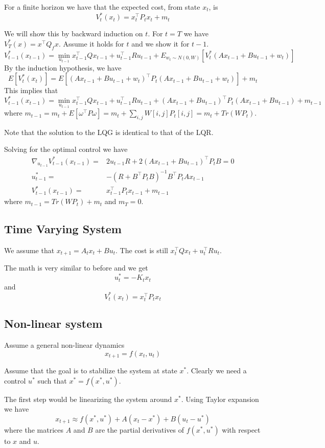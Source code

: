 For a finite horizon we have that the expected cost, from state $x_t$, is
\[
V^*_t(x_t)= x_t^\top P_t x_t + m_t
\]

 We will show this by
backward induction on $t$. For $t=T$ we have $V_T^*(x)=x^\top Q_fx$.
Assume it holds for $t$ and we show it for $t-1$.
\[
V^*_{t-1}(x_{t-1})=\min_{u_{t-1}} x_{t-1}^\top Qx_{t-1}+u_{t-1}^\top
Ru_{t-1}+E_{w_t\sim N(0,W)}[V^*_t(Ax_{t-1}+Bu_{t-1}+w_t)]
\]
By the induction hypothesis, we have
\[
E[V^*_t(x_t)]=E[(Ax_{t-1}+Bu_{t-1}+w_t)^\top P_t
(Ax_{t-1}+Bu_{t-1}+w_t)]+m_t
\]
This implies that
\[
V^*_{t-1}(x_{t-1})=\min_{u_{t-1}} x_{t-1}^\top Qx_{t-1}+u_{t-1}^\top
Ru_{t-1}+(Ax_{t-1}+Bu_{t-1})^\top P_t (Ax_{t-1}+Bu_{t-1})+m_{t-1}
\]
where $m_{t-1}=m_t +E[\omega^\top P \omega]=m_t +\sum_{i,j} W[i,j]P_t[i,j]=m_t +Tr(WP_t)$.

Note that the solution to the LQG is identical to that of the LQR.

Solving for the optimal control we have
\begin{align*}
\nabla_{u_{t-1}} V^*_{t-1}(x_{t-1}) =&
2u_{t-1}R+2(Ax_{t-1}+Bu_{t-1})^\top P_t B =0\\
u_{t-1}^*=& -(R+B^\top P_t B)^{-1}B^\top P_t Ax_{t-1}\\
V^*_{t-1}(x_{t-1})=&x_{t-1}^\top P_t x_{t-1} + m_{t-1}
\end{align*}
where $m_{t-1}=Tr(WP_t)+m_t$ and $m_T=0$.

\subsection{Time Varying System}

We assume that $x_{t+1}=A_t x_t +B u_t$. The cost is still $x_t^\top
Qx_t+u_t^\top Ru_t$.

The math is very similar to before and we get
\[
u_t^*=-K_t x_t
\]
and
\[
V^*_t(x_t)=x_t^\top P_t x_t
\]

\subsection{Non-linear system}

Assume a general non-linear dynamics
\[
x_{t+1}=f(x_t,u_t)
\]

Assume that the goal is to stabilize the system at state $x^*$.
Clearly we need a control $u^*$ such that $x^*=f(x^*,u^*)$.

The first step would be linearizing the system around $x^*$. Using
Taylor expansion we have
\[
x_{t+1}\approx f(x^*,u^*)+A(x_t-x^*)+B(u_t-u^*)
\]
where the matrices $A$ and $B$ are the partial derivatives of
$f(x^*,u^*)$ with respect to $x$ and $u$.

